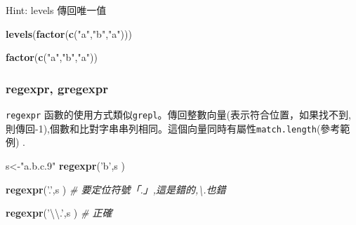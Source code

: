 \documentclass[]{book}
\newenvironment{Shaded}{\begin{snugshade}}{\end{snugshade}}
\newcommand{\CharTok}[1]{\textcolor[rgb]{0.31,0.60,0.02}{#1}}
\newcommand{\CommentTok}[1]{\textcolor[rgb]{0.56,0.35,0.01}{\textit{#1}}}
\newcommand{\KeywordTok}[1]{\textcolor[rgb]{0.13,0.29,0.53}{\textbf{#1}}}
\newcommand{\NormalTok}[1]{#1}
\newcommand{\StringTok}[1]{\textcolor[rgb]{0.31,0.60,0.02}{#1}}
\theoremstyle{definition}
\theoremstyle{definition}
\theoremstyle{definition}
\theoremstyle{remark}
\begin{document}
Hint: levels 傳回唯一值

\begin{Shaded}
\begin{Highlighting}[]
\KeywordTok{levels}\NormalTok{(}\KeywordTok{factor}\NormalTok{(}\KeywordTok{c}\NormalTok{(}\StringTok{"a"}\NormalTok{,}\StringTok{"b"}\NormalTok{,}\StringTok{"a"}\NormalTok{)))}
\end{Highlighting}
\end{Shaded}

\begin{Shaded}
\begin{Highlighting}[]
\KeywordTok{factor}\NormalTok{(}\KeywordTok{c}\NormalTok{(}\StringTok{"a"}\NormalTok{,}\StringTok{"b"}\NormalTok{,}\StringTok{"a"}\NormalTok{))}
\end{Highlighting}
\end{Shaded}

\hypertarget{regexpr-gregexpr}{%
\subsubsection{regexpr, gregexpr}\label{regexpr-gregexpr}}

\texttt{regexpr}
函數的使用方式類似\texttt{grepl}。傳回整數向量(表示符合位置，如果找不到,則傳回-1),個數和比對字串串列相同。這個向量同時有屬性\texttt{match.length}(參考範例)
.

\begin{Shaded}
\begin{Highlighting}[]
\NormalTok{s<-}\StringTok{"a.b.c.9"}
\KeywordTok{regexpr}\NormalTok{(}\StringTok{'b'}\NormalTok{,s )}
\end{Highlighting}
\end{Shaded}

\begin{Shaded}
\begin{Highlighting}[]
\KeywordTok{regexpr}\NormalTok{(}\StringTok{'.'}\NormalTok{,s ) }\CommentTok{# 要定位符號「.」,這是錯的,\textbackslash{}.也錯}
\end{Highlighting}
\end{Shaded}

\begin{Shaded}
\begin{Highlighting}[]
\KeywordTok{regexpr}\NormalTok{(}\StringTok{'}\CharTok{\textbackslash{}\textbackslash{}}\StringTok{.'}\NormalTok{,s ) }\CommentTok{# 正確}
\end{Highlighting}
\end{Shaded}
\end{document}

